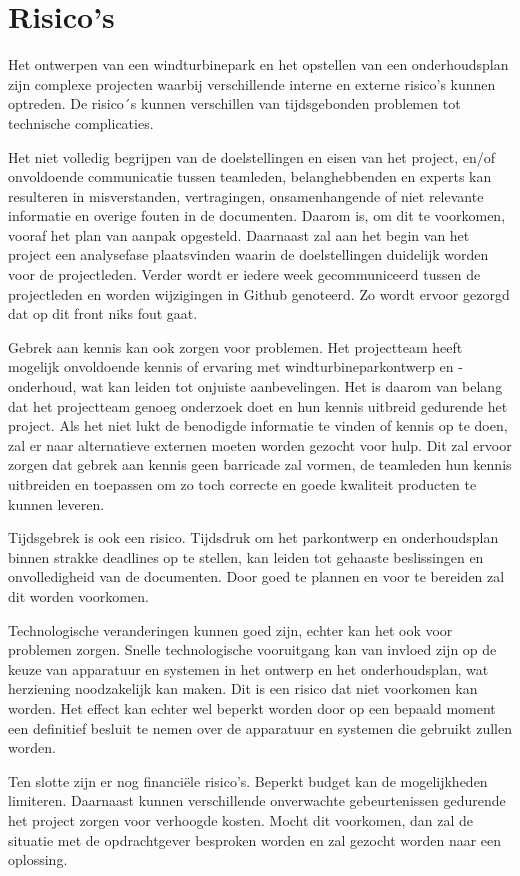 \section{Risico’s}
Het ontwerpen van een windturbinepark en het opstellen van een onderhoudsplan zijn complexe projecten waarbij verschillende interne en externe risico's kunnen optreden. De risico´s kunnen verschillen van tijdsgebonden problemen tot technische complicaties. 

Het niet volledig begrijpen van de doelstellingen en eisen van het project, en/of onvoldoende communicatie tussen teamleden, belanghebbenden en experts kan resulteren in misverstanden, vertragingen, onsamenhangende of niet relevante informatie en overige fouten in de documenten. Daarom is, om dit te voorkomen, vooraf het plan van aanpak opgesteld. Daarnaast zal aan het begin van het project een analysefase plaatsvinden waarin de doelstellingen duidelijk worden voor de projectleden. Verder wordt er iedere week gecommuniceerd tussen de projectleden en worden wijzigingen in Github genoteerd. Zo wordt ervoor gezorgd dat op dit front niks fout gaat. 

Gebrek aan kennis kan ook zorgen voor problemen. Het projectteam heeft mogelijk onvoldoende kennis of ervaring met windturbineparkontwerp en -onderhoud, wat kan leiden tot onjuiste aanbevelingen. Het is daarom van belang dat het projectteam genoeg onderzoek doet en hun kennis uitbreid gedurende het project. Als het niet lukt de benodigde informatie te vinden of kennis op te doen, zal er naar alternatieve externen moeten worden gezocht voor hulp. Dit zal ervoor zorgen dat gebrek aan kennis geen barricade zal vormen, de teamleden hun kennis uitbreiden en toepassen om zo toch correcte en goede kwaliteit producten te kunnen leveren. 

Tijdsgebrek is ook een risico. Tijdsdruk om het parkontwerp en onderhoudsplan binnen strakke deadlines op te stellen, kan leiden tot gehaaste beslissingen en onvolledigheid van de documenten. Door goed te plannen en voor te bereiden zal dit worden voorkomen. 

Technologische veranderingen kunnen goed zijn, echter kan het ook voor problemen zorgen. Snelle technologische vooruitgang kan van invloed zijn op de keuze van apparatuur en systemen in het ontwerp en het onderhoudsplan, wat herziening noodzakelijk kan maken. Dit is een risico dat niet voorkomen kan worden. Het effect kan echter wel beperkt worden door op een bepaald moment een definitief besluit te nemen over de apparatuur en systemen die gebruikt zullen worden. 

Ten slotte zijn er nog financiële risico's. Beperkt budget kan de mogelijkheden limiteren. Daarnaast kunnen verschillende onverwachte gebeurtenissen gedurende het project zorgen voor verhoogde kosten. Mocht dit voorkomen, dan zal de situatie met de opdrachtgever besproken worden en zal gezocht worden naar een oplossing.